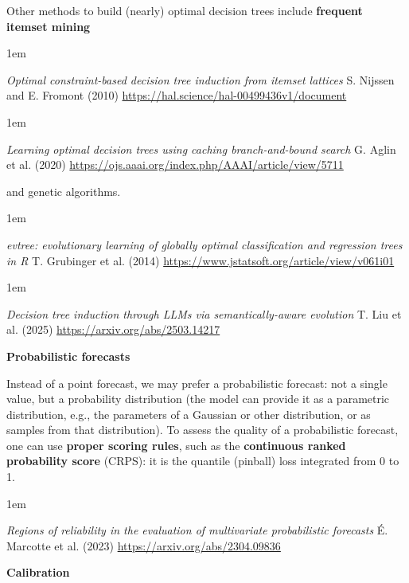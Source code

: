 \documentclass[a5paper]{article}
\let\d\textbf
\newenvironment{reference}{%
  \medskip\goodbreak
  \parskip 0pt
  \raggedright
  \leftskip 1em
  \obeylines
}{\par\medskip\goodbreak}
\def\subsection#1{{\par\bigskip\goodbreak\large\bfseries #1\par}}
\begin{document}
Other methods to build (nearly) optimal decision trees include \d{frequent itemset mining}

\begin{reference}
  \emph{Optimal constraint-based decision tree induction from itemset lattices}
  S. Nijssen and E. Fromont (2010)
  \url{https://hal.science/hal-00499436v1/document}
\end{reference}

\begin{reference}
  \emph{Learning optimal decision trees  using caching branch-and-bound search}
  G. Aglin et al. (2020)
  \url{https://ojs.aaai.org/index.php/AAAI/article/view/5711}
\end{reference}

and genetic algorithms.

\begin{reference}
  \emph{evtree: evolutionary learning of globally optimal classification and regression trees in R}
  T. Grubinger et al. (2014)
  \url{https://www.jstatsoft.org/article/view/v061i01}
\end{reference}

\begin{reference}
  \emph{Decision tree induction through LLMs  via semantically-aware evolution}
  T. Liu et al. (2025)
  \url{https://arxiv.org/abs/2503.14217}
\end{reference}

\subsection{Probabilistic forecasts}

Instead of a point forecast, we may prefer a probabilistic forecast:
not a single value, but a probability distribution (the model can provide it as a parametric distribution,
e.g., the parameters of a Gaussian or other distribution,
or as samples from that distribution).
To assess the quality of a probabilistic forecast,
one can use \d{proper scoring rules},
such as the \d{continuous ranked probability score} (CRPS):
it is the quantile (pinball) loss
integrated from 0 to 1.

\begin{reference}
  \emph{Regions of reliability in the evaluation of multivariate probabilistic forecasts}
  É. Marcotte et al. (2023)
  \url{https://arxiv.org/abs/2304.09836}
\end{reference}

\subsection{Calibration}
\end{document}
